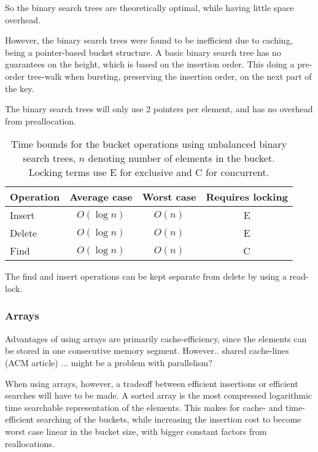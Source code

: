 So the binary search trees are theoretically optimal, while having little space
overhead.

However, the binary search trees were found to be inefficient due to caching,
being a pointer-based bucket structure. A basic binary search tree has no
guarantees on the height, which is based on the insertion order. This doing a
pre-order tree-walk when bursting, preserving the insertion order, on the next
part of the key.

The binary search trees will only use 2 pointers per element, and
has no overhead from preallocation. 

\begin{table}[h!]
    \centering
    \begin{tabular}[here]{ l || c | c | c}
        Operation & Average case & Worst case & Requires locking  \\ \hline
        Insert    & $O(\log n)$ & $O(n)$ & E \\ \hline
        Delete    & $O(\log n)$ & $O(n)$ & E \\ \hline
        Find      & $O(\log n)$ & $O(n)$ & C  \\ \hline
    \end{tabular}
    \caption{Time bounds for the bucket operations using unbalanced binary
    search trees, $n$ denoting number of elements in the bucket. Locking terms
    use E for exclusive and C for concurrent.}
    \label{tab:bounds:bst}
\end{table}
The find and insert operations can be kept separate from delete by using a
read-lock.

\subsubsection{Arrays}
Advantages of using arrays are primarily cache-efficiency, since the
elements can be stored in one consecutive memory segment.
However.. shared cache-lines (ACM article) ... might be a problem with parallelism?

When using arrays, however, a tradeoff between efficient insertions or
efficient searches will have to be made. A sorted array is the most compressed
logarithmic time searchable representation of the elements. This makes for
cache- and time-efficient searching of the buckets, while increasing the
insertion cost to become worst case linear in the bucket size, with bigger
constant factors from reallocations.

